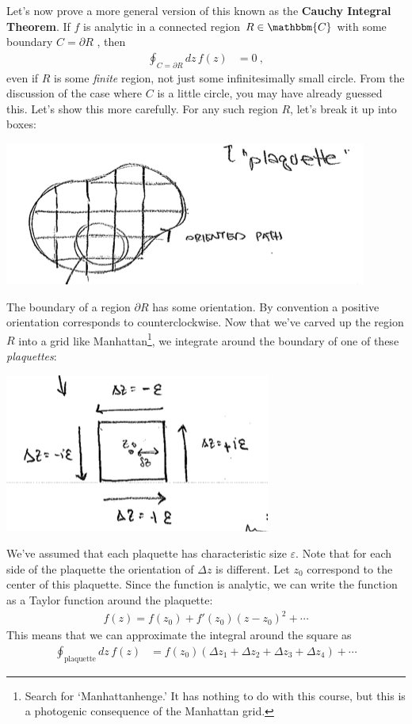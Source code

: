 Let's now prove a more general version of this known as the \textbf{Cauchy Integral Theorem}. If $f$ is analytic in a connected region $R \in \mathbbm{C}$ with some boundary $C = \partial R$ , then 
\begin{align}
	\oint_{C=\partial R} dz\, f(z) &= 0 \ ,
\end{align}
even if $R$ is some \emph{finite} region, not just some infinitesimally small circle. From the discussion of the case where $C$ is a little circle, you may have already guessed this. Let's show this more carefully. For any such region $R$, let's break it up into boxes:
\begin{center}
\includegraphics[width=.5\textwidth]{figures/Lec_2017_12_plaquette.png}
\end{center}
The boundary of a region $\partial R$ has some orientation. By convention a positive orientation corresponds to counterclockwise. Now that we've carved up the region $R$ into a grid like Manhattan\footnote{Search for `Manhattanhenge.' It has nothing to do with this course, but this is a photogenic consequence of the Manhattan grid.}, we integrate around the boundary of one of these \emph{plaquettes}:
\begin{center}
\includegraphics[width=.4\textwidth]{figures/Lec_2017_plaq_int.png}
\end{center}
We've assumed that each plaquette has characteristic size $\varepsilon$. Note that for each side of the plaquette the orientation of $\Delta z$ is different. Let $z_0$ correspond to the center of this plaquette. Since the function is analytic, we can write the function as a Taylor function around the plaquette:
\begin{align}
	f(z) = f(z_0) + f'(z_0) (z-z_0)^2 + \cdots
\end{align}
This means that we can approximate the integral around the square as
\begin{align}
	\oint_\text{plaquette} dz\,  f(z)
	&= 
	f(z_0)
	\left(
		\Delta z_1 + \Delta z_2 + \Delta z_3 + \Delta z_4
	\right)
	+ \cdots
\end{align}
